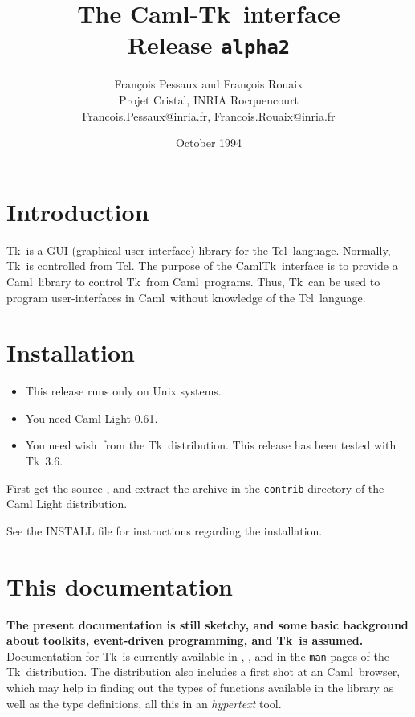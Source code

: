 
\newcommand{\tcl}{{\sf Tcl}}
\newcommand{\tk}{{\sf Tk}}
\newcommand{\caml}{{\sf Caml}}
\newcommand{\camltk}{{\sf CamlTk}}
\newcommand{\wish}{{\sf wish}}
\newcommand{\thisrelease}{{\tt alpha2}}
\title{The \caml-\tk\ interface \\
       Release \thisrelease}
\author{Fran\c{c}ois Pessaux and Fran\c{c}ois Rouaix \\
           Projet Cristal, INRIA Rocquencourt \\
        {\small Francois.Pessaux@inria.fr, Francois.Rouaix@inria.fr}
        }
\date{October 1994}

\maketitle


\section*{Introduction}
\tk\ is a GUI (graphical user-interface) library for the \tcl\ language.
Normally, \tk\ is controlled from \tcl. The purpose of the \camltk\
interface is to provide a \caml\ library to control \tk\ from \caml\
programs. Thus, \tk\ can be used to program user-interfaces in \caml\
without knowledge of the \tcl\ language.

\section*{Installation}

\begin{itemize}
\item This release runs only on Unix systems.
\item You need Caml Light 0.61.
\item You need \wish\, from the \tk\ distribution. This release has been
tested with \tk\ 3.6.
\end{itemize} 

\begin{htmlonly}
First get the source
,
and extract the archive in the {\tt contrib} directory of the Caml Light
distribution. 
\end{htmlonly}

See the INSTALL file for instructions regarding the installation.


\section*{This documentation}
{\bf The present documentation is still sketchy, and some basic background
about toolkits, event-driven programming, and \tk\ is assumed.}
Documentation for \tk\ is currently available in \cite{ouster94},
\cite{welch94}, and in the {\tt man} pages of the \tk\ distribution.
The distribution also includes a first shot at an \caml\ browser, which may
help in finding out the types of functions available in the library as well as
the type definitions, all this in an {\em hypertext} tool.


